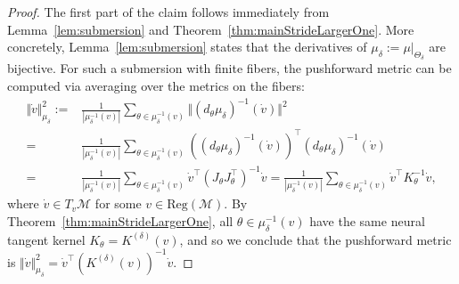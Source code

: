 \documentclass[twoside]{article}
\theoremstyle{definition}
\theoremstyle{remark}
\begin{document}
\begin{proof}
	The first part of the claim follows immediately from Lemma~\ref{lem:submersion} and Theorem~\ref{thm:mainStrideLargerOne}.
	More concretely, Lemma~\ref{lem:submersion} states that the derivatives of $\mu_\delta := \mu |_{\Theta_\delta}$ are bijective.
	For such a submersion with finite fibers, the pushforward metric can be computed via averaging over the metrics on the fibers:	\begin{align*}
		\Vert \dot v \Vert_{\mu_\delta}^2 
		:= & \frac{1}{|\mu_\delta^{-1}(v)|} \sum_{\theta \in \mu_\delta^{-1}(v)} \Vert (d_\theta \mu_\delta)^{-1} (\dot v) \Vert^2
	\\	= & \frac{1}{|\mu_\delta^{-1}(v)|} \sum_{\theta \in \mu_\delta^{-1}(v)} ((d_\theta \mu_\delta)^{-1} (\dot v))^\top (d_\theta \mu_\delta)^{-1} (\dot v)
		\\ = & \frac{1}{|\mu_\delta^{-1}(v)|}  \sum_{\theta \in \mu_\delta^{-1}(v)}  \dot v^\top (J_\theta J_\theta^\top)^{-1} \dot v 
		=\frac{1}{|\mu_\delta^{-1}(v)|}  \sum_{\theta \in \mu_\delta^{-1}(v)}  \dot v^\top K_\theta^{-1} \dot v,
	\end{align*}
	where $\dot v \in T_v \mathcal{M}$ for some $v \in \mathrm{Reg}(\mathcal{M})$.
	By	Theorem~\ref{thm:mainStrideLargerOne},  all $\theta \in \mu_\delta^{-1}(v)$  have the same neural tangent kernel $K_\theta = K^{(\delta)}(v)$,
	and so we conclude
	that the pushforward metric is 
	$\Vert \dot v \Vert_{\mu_\delta}^2 = \dot v^\top (K^{(\delta)}(v))^{-1} \dot v$.
\end{proof}
\end{document}
